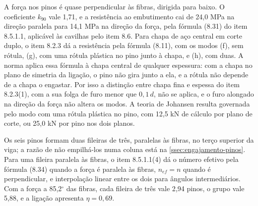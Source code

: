 
A força nos pinos é quase perpendicular às fibras, dirigida para baixo. O
coeficiente $k_{90}$ vale 1,71, e a resistência ao embutimento cai de 24,0 MPa
na direção paralela para 14,1 MPa na direção da força, pela fórmula (8.31) do
item 8.5.1.1, aplicável às cavilhas pelo item 8.6. Para chapa de aço central em
corte duplo, o item 8.2.3 dá a resistência pela fórmula (8.11), com os modos
(f), sem rótula, (g), com uma rótula plástica no pino junto à chapa, e (h), com
duas. A norma aplica essa fórmula à chapa central de qualquer espessura: com a
chapa no plano de simetria da ligação, o pino não gira junto a ela, e a rótula
não depende de a chapa o engastar. Por isso a distinção entre chapa fina e
espessa do item 8.2.3(1), com a sua folga de furo menor que $0{,}1\,d$, não se
aplica, e o furo alongado na direção da força não altera os modos. A teoria de
Johansen resulta governada pelo modo com uma rótula plástica no pino, com
12,5 kN de cálculo por plano de corte, ou 25,0 kN por pino nos dois planos.

Os seis pinos formam duas fileiras de três, paralelas às fibras, no terço
superior da viga; a razão de não empilhá-los numa coluna está na
\autoref{ssec:engajamento-pinos}. Para uma fileira paralela às fibras, o item
8.5.1.1(4) dá o número efetivo pela fórmula (8.34) quando a força é paralela
às fibras, $n_{ef} = n$ quando é perpendicular, e interpolação linear entre os
dois para ângulos intermediários. Com a força a 85,2$^{\circ}$ das fibras, cada
fileira de três vale 2,94 pinos, o grupo vale 5,88, e a ligação apresenta
$\eta = 0{,}69$.

